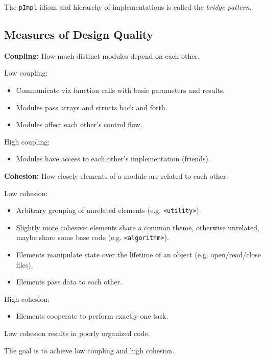 \documentclass[11pt]{article}
\theoremstyle{definition}
\begin{document}
The {\tt pImpl} idiom and hierarchy of implementations is called the \emph{bridge pattern}.

\subsection{Measures of Design Quality}
{\bf Coupling:} How much distinct modules depend on each other.

Low coupling:\vspace{-0.25cm}
\begin{itemize}
\item Communicate via function calls with basic parameters and results.
\item Modules pass arrays and structs back and forth.
\item Modules affect each other's control flow.
\end{itemize}
\vspace{-0.25cm} High coupling: \vspace{-0.25cm}
\begin{itemize}
\item Modules have access to each other's implementation (friends).
\end{itemize}
{\bf Cohesion:} How closely elements of a module are related to each other.

Low cohesion:\vspace{-0.25cm}
\begin{itemize}
\item Arbitrary grouping of unrelated elements (e.g. {\tt <utility>}). 
\item Slightly more cohesive: elements share a common theme, otherwise unrelated, maybe share some base code (e.g. {\tt <algorithm>}).
\item Elements manipulate state over the lifetime of an object (e.g. open/read/close files).
\item Elements pass data to each other.
\end{itemize}
\vspace{-0.25cm} High cohesion: \vspace{-0.25cm}
\begin{itemize}
\item Elements cooperate to perform exactly one task.
\end{itemize}
\vspace{-0.25cm}
Low cohesion results in poorly organized code. 

The goal is to achieve low coupling and high cohesion.
\end{document}
